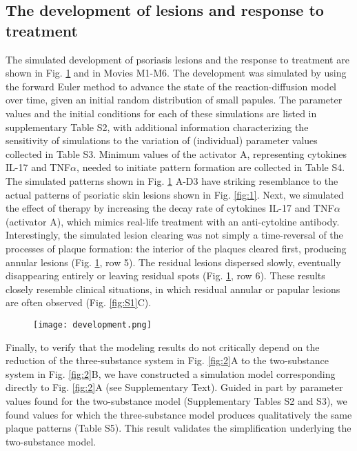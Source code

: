 \subsection{The development of lesions and response to treatment}
The simulated development of psoriasis lesions and the response to treatment are shown in Fig. \ref{fig:4} and in Movies M1-M6. The development was simulated by using the forward Euler method to advance the state of the reaction-diffusion model over time, given an initial random distribution of small papules. The parameter values and the initial conditions for each of these simulations are listed in supplementary Table S2, with additional information characterizing the sensitivity of simulations to the variation of (individual) parameter values collected in Table S3. Minimum values of the activator A, representing cytokines IL-17 and TNF$\alpha$, needed to initiate pattern formation are collected in Table S4. The simulated patterns shown in Fig. \ref{fig:4} A-D3 have striking resemblance to the actual patterns of psoriatic skin lesions shown in Fig. \ref{fig:1}. Next, we simulated the effect of therapy by increasing the decay rate of cytokines IL-17 and TNF$\alpha$ (activator A), which mimics real-life treatment with an anti-cytokine antibody. Interestingly, the simulated lesion clearing was not simply a time-reversal of the processes of plaque formation: the interior of the plaques cleared first, producing annular lesions (Fig. \ref{fig:4}, row 5). The residual lesions dispersed slowly, eventually disappearing entirely or leaving residual spots (Fig. \ref{fig:4}, row 6). These results closely resemble clinical situations, in which residual annular or papular lesions are often observed (Fig. \ref{fig:S1}C). 

\begin{figure}[!htb]
	\centering
	\texttt{[image: development.png]}
	\label{fig:4}
\end{figure}

Finally, to verify that the modeling results do not critically depend on the reduction of the three-substance system in Fig. \ref{fig:2}A to the two-substance system in Fig. \ref{fig:2}B, we have constructed a simulation model corresponding directly to Fig. \ref{fig:2}A (see Supplementary Text). Guided in part by parameter values found for the two-substance model (Supplementary Tables S2 and S3), we found values for which the three-substance model produces qualitatively the same plaque patterns (Table S5). This result validates the simplification underlying the two-substance model.

